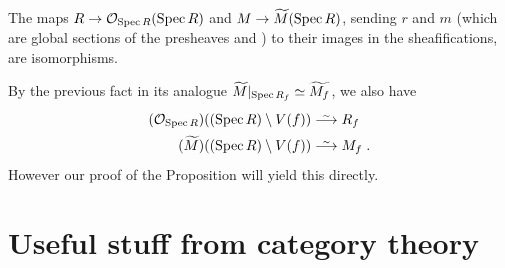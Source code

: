 \documentclass[a4paper,parskip=half,numbers=enddot, DIV=12]{scrreprt}
\begin{document}
\begin{prop}
    The maps $R\morphism \Oo_{\Spec R}(\Spec R)$ and $M\morphism \snake M (\Spec R)$, sending $r$ and $m$ (which are global sections of the presheaves  and ) to their images in the sheafifications, are isomorphisms.
\end{prop}
\begin{rem*}
    By the previous fact in its analogue $\snake M|_{\Spec R_f} \simeq \snake{M_f}$, we also have
    \begin{align*}
        (\Oo_{\Spec R})((\Spec R)\setminus V(f)) &\isomorphism R_f\\
        (\snake M)((\Spec R)\setminus V(f)) &\isomorphism M_f\;.
    \end{align*}
    However our proof of the Proposition will yield this directly.
\end{rem*}









    
    
     
    
    
    
    \appendix
    \chapter{Useful stuff from category theory}
\end{document}
